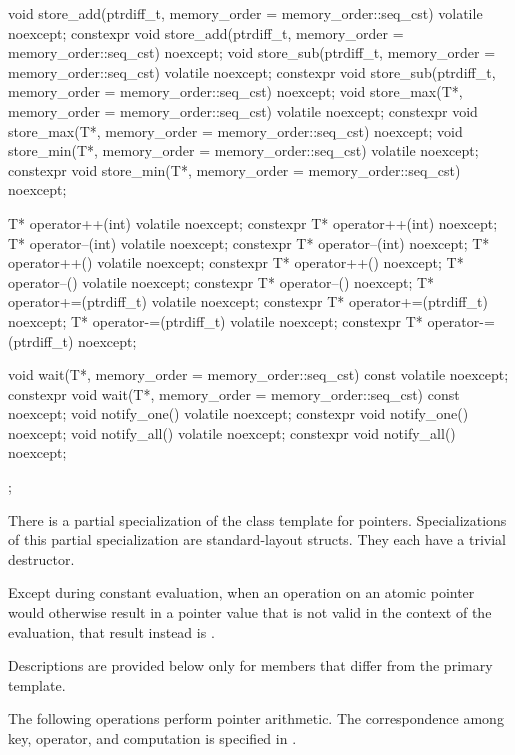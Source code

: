 \begin{codeblock}
{{    void store_add(ptrdiff_t, memory_order = memory_order::seq_cst) volatile noexcept;
    constexpr void store_add(ptrdiff_t, memory_order = memory_order::seq_cst) noexcept;
    void store_sub(ptrdiff_t, memory_order = memory_order::seq_cst) volatile noexcept;
    constexpr void store_sub(ptrdiff_t, memory_order = memory_order::seq_cst) noexcept;
    void store_max(T*, memory_order = memory_order::seq_cst) volatile noexcept;
    constexpr void store_max(T*, memory_order = memory_order::seq_cst) noexcept;
    void store_min(T*, memory_order = memory_order::seq_cst) volatile noexcept;
    constexpr void store_min(T*, memory_order = memory_order::seq_cst) noexcept;

    T* operator++(int) volatile noexcept;
    constexpr T* operator++(int) noexcept;
    T* operator--(int) volatile noexcept;
    constexpr T* operator--(int) noexcept;
    T* operator++() volatile noexcept;
    constexpr T* operator++() noexcept;
    T* operator--() volatile noexcept;
    constexpr T* operator--() noexcept;
    T* operator+=(ptrdiff_t) volatile noexcept;
    constexpr T* operator+=(ptrdiff_t) noexcept;
    T* operator-=(ptrdiff_t) volatile noexcept;
    constexpr T* operator-=(ptrdiff_t) noexcept;

    void wait(T*, memory_order = memory_order::seq_cst) const volatile noexcept;
    constexpr void wait(T*, memory_order = memory_order::seq_cst) const noexcept;
    void notify_one() volatile noexcept;
    constexpr void notify_one() noexcept;
    void notify_all() volatile noexcept;
    constexpr void notify_all() noexcept;
  };
}
\end{codeblock}

%
\pnum
There is a partial specialization of the  class template for pointers.
Specializations of this partial specialization are standard-layout structs.
They each have a trivial destructor.

\pnum
Except during constant evaluation,
when an operation on an atomic pointer
would otherwise result in a pointer value 
that is not valid in the context of the evaluation,
that result instead is
.

\pnum
Descriptions are provided below only for members that differ from the primary template.

\pnum
The following operations perform pointer arithmetic.
The correspondence among key, operator, and computation is specified
in .


